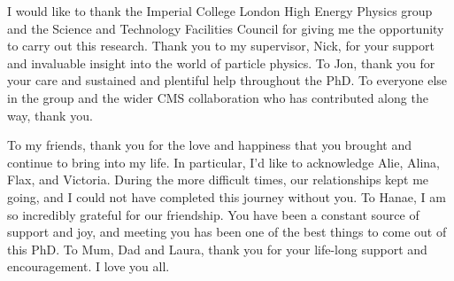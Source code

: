 
I would like to thank the Imperial College London High Energy Physics group and the Science and Technology Facilities Council for giving me the opportunity to carry out this research. Thank you to my supervisor, Nick, for your support and invaluable insight into the world of particle physics. To Jon, thank you for your care and sustained and plentiful help throughout the PhD. To everyone else in the group and the wider CMS collaboration who has contributed along the way, thank you.

To my friends, thank you for the love and happiness that you brought and continue to bring into my life. In particular, I'd like to acknowledge Alie, Alina, Flax, and Victoria. During the more difficult times, our relationships kept me going, and I could not have completed this journey without you. To Hanae, I am so incredibly grateful for our friendship. You have been a constant source of support and joy, and meeting you has been one of the best things to come out of this PhD. To Mum, Dad and Laura, thank you for your life-long support and encouragement. I love you all.

\ftsection{}

\restoregeometry

\cleardoublepage
{}
\tableofcontents

{}
\listoffigures

{}
\listoftables

\newpage
\thispagestyle{empty}
\vspace*{\fill}